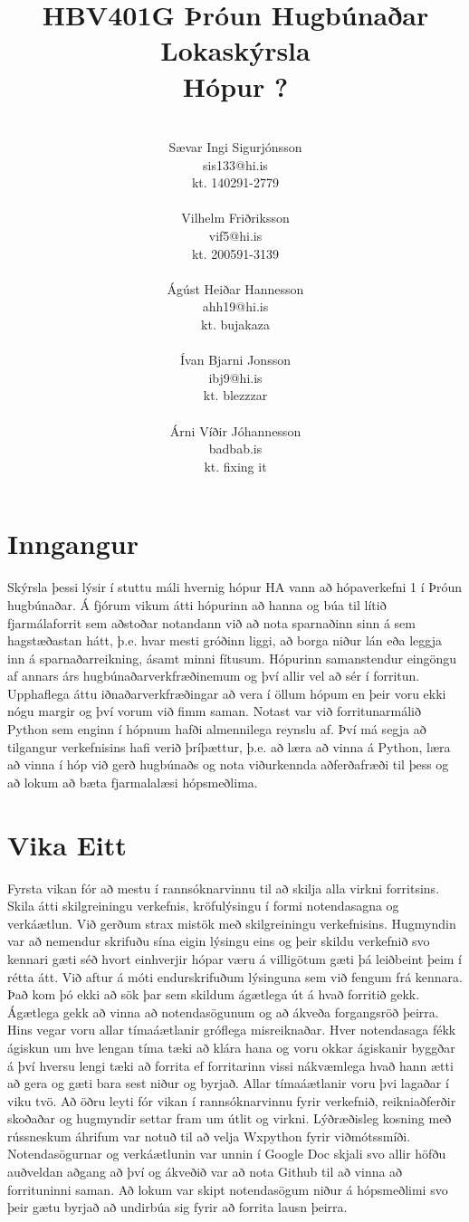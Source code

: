 \documentclass[a4paper, 12 pt]{article}
\title{HBV401G Þróun Hugbúnaðar\\ 
	Lokaskýrsla \\
	Hópur ?	
}
\author{\\Sævar Ingi Sigurjónsson \\
	sis133@hi.is\\
	kt. 140291-2779\\
	\\
	Vilhelm Friðriksson\\
	vif5@hi.is\\
	kt. 200591-3139\\
	\\	
	Ágúst Heiðar Hannesson\\
	ahh19@hi.is\\
	kt. bujakaza\\
	\\
	Ívan Bjarni Jonsson\\
	ibj9@hi.is\\
	kt. blezzzar\\
	\\
	Árni Víðir Jóhannesson\\
	badbab.is\\
	kt. fixing it\\
}
\begin{document}
\maketitle
\pagebreak

\section{Inngangur}
Skýrsla þessi lýsir í stuttu máli hvernig hópur HA vann að hópaverkefni 1 í Þróun hugbúnaðar.  Á fjórum vikum átti hópurinn að hanna og búa til lítið fjarmálaforrit sem aðstoðar notandann við að nota sparnaðinn sinn á sem hagstæðastan hátt, þ.e. hvar mesti gróðinn liggi, að borga niður lán eða leggja inn á sparnaðarreikning, ásamt minni fítusum.  Hópurinn samanstendur eingöngu af annars árs hugbúnaðarverkfræðinemum og því allir vel að sér í forritun.  Upphaflega áttu iðnaðarverkfræðingar að vera í öllum hópum en þeir voru ekki nógu margir og því vorum við fimm saman. Notast var við forritunarmálið Python sem enginn í hópnum hafði almennilega reynslu af.  Því má segja að tilgangur verkefnisins hafi verið þríþættur, þ.e. að læra að vinna á Python, læra að vinna í hóp við gerð hugbúnaðs og nota viðurkennda aðferðafræði til þess og að lokum að bæta fjarmalalæsi hópsmeðlima.



\section{Vika Eitt}
Fyrsta vikan fór að mestu í rannsóknarvinnu til að skilja alla virkni forritsins.  Skila átti skilgreiningu verkefnis, kröfulýsingu í formi notendasagna og verkáætlun.  Við gerðum strax mistök með skilgreiningu verkefnisins.  Hugmyndin var að nemendur skrifuðu sína eigin lýsingu eins og þeir skildu verkefnið svo kennari gæti séð hvort einhverjir hópar væru á villigötum gæti þá leiðbeint þeim í rétta átt.  Við aftur á móti endurskrifuðum lýsinguna sem við fengum frá kennara.  Það kom þó ekki að sök þar sem skildum ágætlega út á hvað forritið gekk.  Ágætlega gekk að vinna að notendasögunum og að ákveða forgangsröð þeirra.  Hins vegar voru allar tímaáætlanir gróflega misreiknaðar.  Hver notendasaga fékk ágiskun um hve lengan tíma tæki að klára hana og voru okkar ágiskanir byggðar á því hversu lengi tæki að forrita ef forritarinn vissi nákvæmlega hvað hann ætti að gera og gæti bara sest niður og byrjað.  Allar tímaáætlanir voru þvi lagaðar í viku tvö.  
Að öðru leyti fór vikan í rannsóknarvinnu fyrir verkefnið, reikniaðferðir skoðaðar og hugmyndir settar fram um útlit og virkni.  Lýðræðisleg kosning með rússneskum áhrifum var notuð til að velja Wxpython fyrir viðmótssmíði.  Notendasögurnar og verkáætlunin var unnin í Google Doc skjali svo allir höfðu auðveldan aðgang að því og ákveðið var að nota Github til að vinna að forrituninni saman.  Að lokum var skipt notendasögum niður á hópsmeðlimi svo þeir gætu byrjað að undirbúa sig fyrir að forrita lausn þeirra.
\end{document}
